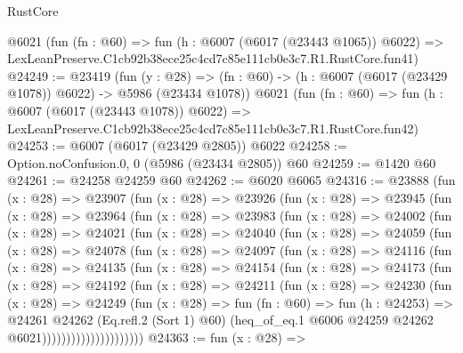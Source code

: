 \begin{lexlean}{RustCore}
\begin{coremodule}
    @6021
    (fun (fn : @60) =>
    fun (h : @6007 (@6017 (@23443 @1065)) @6022) =>
    LexLeanPreserve.C1cb92b38ece25c4cd7c85e111cb0e3c7.R1.RustCore.fun41)
@24249 := @23419
    (fun (y : @28) =>
    (fn : @60) -> (h : @6007 (@6017 (@23429 @1078)) @6022) -> @5986 (@23434 @1078))
    @6021
    (fun (fn : @60) =>
    fun (h : @6007 (@6017 (@23443 @1078)) @6022) =>
    LexLeanPreserve.C1cb92b38ece25c4cd7c85e111cb0e3c7.R1.RustCore.fun42)
@24253 := @6007 (@6017 (@23429 @2805)) @6022
@24258 := Option.noConfusion.{0, 0} (@5986 (@23434 @2805)) @60
@24259 := @1420 @60
@24261 := @24258 @24259 @60
@24262 := @6020 @6065
@24316 := @23888
    (fun (x : @28) =>
    @23907
      (fun (x : @28) =>
      @23926
        (fun (x : @28) =>
        @23945
          (fun (x : @28) =>
          @23964
            (fun (x : @28) =>
            @23983
              (fun (x : @28) =>
              @24002
                (fun (x : @28) =>
                @24021
                  (fun (x : @28) =>
                  @24040
                    (fun (x : @28) =>
                    @24059
                      (fun (x : @28) =>
                      @24078
                        (fun (x : @28) =>
                        @24097
                          (fun (x : @28) =>
                          @24116
                            (fun (x : @28) =>
                            @24135
                              (fun (x : @28) =>
                              @24154
                                (fun (x : @28) =>
                                @24173
                                  (fun (x : @28) =>
                                  @24192
                                    (fun (x : @28) =>
                                    @24211
                                      (fun (x : @28) =>
                                      @24230
                                        (fun (x : @28) =>
                                        @24249
                                          (fun (x : @28) =>
                                          fun (fn : @60) =>
                                          fun (h : @24253) =>
                                          @24261
                                            @24262
                                            (Eq.refl.{2} (Sort 1) @60)
                                            (heq_of_eq.{1}
                                              @6006
                                              @24259
                                              @24262
                                              @6021)))))))))))))))))))))
@24363 := fun (x : @28) =>

\end{coremodule}
\end{lexlean}
